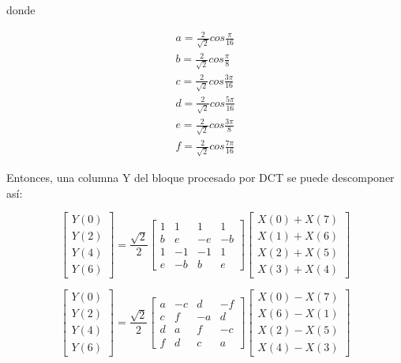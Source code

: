 donde

\begin{eqnarray*}
    a = \frac{2}{\sqrt{2}}cos\frac{\pi}{16}\\
    b = \frac{2}{\sqrt{2}}cos\frac{\pi}{8}\\
    c = \frac{2}{\sqrt{2}}cos\frac{3\pi}{16}\\
    d = \frac{2}{\sqrt{2}}cos\frac{5\pi}{16}\\
    e = \frac{2}{\sqrt{2}}cos\frac{3\pi}{8}\\
    f = \frac{2}{\sqrt{2}}cos\frac{7\pi}{16}
\end{eqnarray*}

Entonces, una columna Y del bloque procesado por DCT se puede descomponer así:

\begin{equation}
    \label{eq:dct-row}
    \begin{bmatrix}
        Y(0) \\
        Y(2) \\
        Y(4) \\
        Y(6)
    \end{bmatrix}
    = \frac{\sqrt{2}}{2} \begin{bmatrix}
        1 & 1 & 1 & 1  \\
        b & e & -e & -b \\
        1 & -1 & -1 & 1  \\
        e & -b & b & e
        \end {bmatrix} \begin {bmatrix}
        X(0) + X(7) \\
        X(1) + X(6) \\
        X(2) + X(5) \\
        X(3) + X(4)
        \end {bmatrix}
\end{equation}

\begin{equation*}
    \begin{bmatrix}
        Y(0) \\
        Y(2) \\
        Y(4) \\
        Y(6)
    \end{bmatrix}
    = \frac{\sqrt{2}}{2} \begin{bmatrix}
        a & -c & d & -f  \\
        c & f & -a & d  \\
        d & a & f & -c  \\
        f & d & c & a
        \end {bmatrix} \begin {bmatrix}
        X(0) - X(7) \\
        X(6) - X(1) \\
        X(2) - X(5) \\
        X(4) - X(3)
        \end {bmatrix}
\end{equation*}

